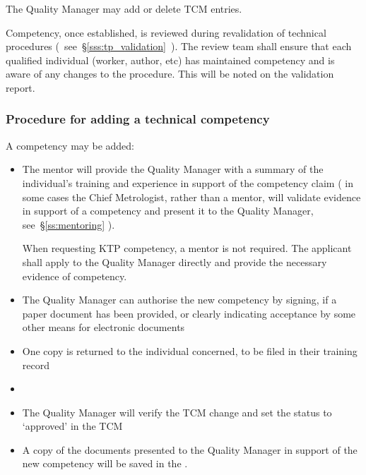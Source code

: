 The Quality Manager may add or delete TCM entries. 

Competency, once established, is reviewed during revalidation of technical procedures (~see~\S\ref{sss:tp_validation}~).  The review team shall ensure that each qualified individual (worker, author, etc) has maintained competency and is aware of any changes to the procedure. This will be noted on the validation report. 

\subsubsection{Procedure for adding a technical competency}
\label{sss:tcm_procedure}
A competency may be added:
\begin{itemize}
\item The mentor will provide the Quality Manager with a summary of the individual's training and experience in support of the competency claim ( in some cases the Chief Metrologist, rather than a mentor, will validate evidence in support of a competency and present it to the Quality Manager, see~\S\ref{ss:mentoring} ). 

When requesting KTP competency, a mentor is not required. The applicant shall apply to the Quality Manager directly and provide the necessary evidence of competency.

\item The Quality Manager can authorise the new competency by signing, if a paper document has been provided, or clearly indicating acceptance by some other means for electronic documents 

\item One copy is returned to the individual concerned, to be filed in their training record

\item {}

\item The Quality Manager will verify the TCM change and set the status to ‘approved' in the TCM 

\item A copy of the documents presented to the Quality Manager in support of the new competency will be saved in the .
\end{itemize}

